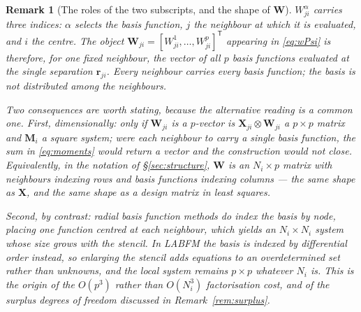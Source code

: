 \documentclass[11pt,a4paper]{article}
\newcommand{\rji}{\bm{r}_{ji}}
\newtheorem{remark}{Remark}
\begin{document}
\begin{remark}[The roles of the two subscripts, and the shape of $\bm W$]
\label{rem:indices}
$W^{\alpha}_{ji}$ carries three indices: $\alpha$ selects the basis function, $j$ the
neighbour at which it is evaluated, and $i$ the centre. The object
$\bm W_{ji}=[W^{1}_{ji},\dots,W^{p}_{ji}]^{\mathsf T}$ appearing in \eqref{eq:wPsi} is
therefore, for one \emph{fixed} neighbour, the vector of \emph{all $p$} basis functions
evaluated at the single separation $\rji$. Every neighbour carries every basis function;
the basis is not distributed among the neighbours.

Two consequences are worth stating, because the alternative reading is a common one.
First, dimensionally: only if $\bm W_{ji}$ is a $p$-vector is
$\bm X_{ji}\otimes\bm W_{ji}$ a $p\times p$ matrix and $\bm M_i$ a square system; were
each neighbour to carry a single basis function, the sum in \eqref{eq:moments} would
return a vector and the construction would not close. Equivalently, in the notation of
\S\ref{sec:structure}, $\bm W$ is an $N_i\times p$ matrix with neighbours indexing rows
and basis functions indexing columns --- the same shape as $\bm X$, and the same shape as
a design matrix in least squares.

Second, by contrast: radial basis function methods \emph{do} index the basis by node,
placing one function centred at each neighbour, which yields an $N_i\times N_i$ system
whose size grows with the stencil. In LABFM the basis is indexed by differential order
instead, so enlarging the stencil adds equations to an overdetermined set rather than
unknowns, and the local system remains $p\times p$ whatever $N_i$ is. This is the origin
of the $O(p^{3})$ rather than $O(N_i^{3})$ factorisation cost, and of the surplus
degrees of freedom discussed in Remark~\ref{rem:surplus}.
\end{remark}

\begin{center}
\end{center}
\end{document}
